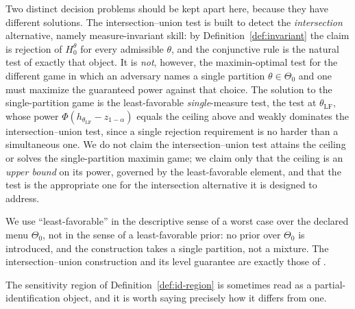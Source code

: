 \documentclass[risks,article,submit,pdftex,oneauthor]{Definitions/mdpi}
\begin{document}
Two distinct decision problems should be kept apart here, because they have
different solutions. The intersection--union test is built to detect the
\emph{intersection} alternative, namely measure-invariant skill: by
Definition~\ref{def:invariant} the claim is rejection of $H_0^\theta$ for every
admissible $\theta$, and the conjunctive rule is the natural test of exactly that
object. It is \emph{not}, however, the maximin-optimal test for the different game
in which an adversary names a single partition $\theta\in\Theta_0$ and one must
maximize the guaranteed power against that choice. The solution to the
single-partition game is the least-favorable \emph{single}-measure test, the test
at $\theta_{\mathrm{LF}}$, whose power $\Phi(h_{\theta_{\mathrm{LF}}}-z_{1-\alpha})$
equals the ceiling above and weakly dominates the intersection--union test, since a
single rejection requirement is no harder than a simultaneous one. We do not claim
the intersection--union test attains the ceiling or solves the single-partition
maximin game; we claim only that the ceiling is an \emph{upper bound} on its power,
governed by the least-favorable element, and that the test is the appropriate one
for the intersection alternative it is designed to address.

We use ``least-favorable'' in the descriptive sense of a worst case over the
declared menu $\Theta_0$, not in the sense of a least-favorable prior: no prior over
$\Theta_0$ is introduced, and the construction takes a single partition, not a
mixture. The intersection--union construction and its level guarantee are exactly
those of \citep{LehmannRomano2005}.

The sensitivity region of Definition~\ref{def:id-region} is sometimes read as a
partial-identification object, and it is worth saying precisely how it differs from
one.
\end{document}
